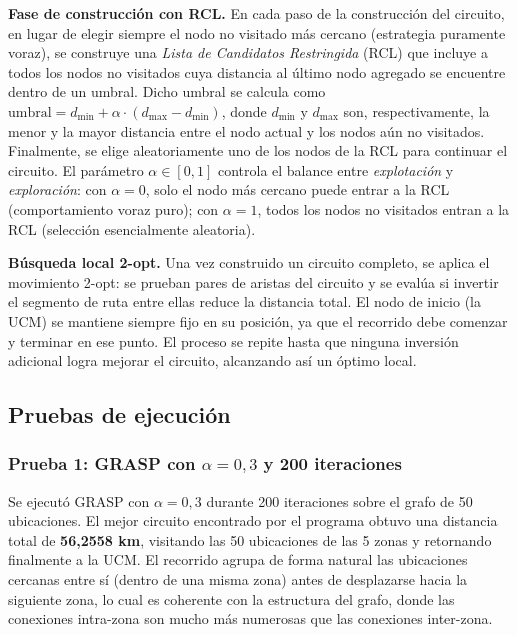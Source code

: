 \documentclass[12pt,letterpaper]{article}
\begin{document}
\textbf{Fase de construcción con RCL.} En cada paso de la construcción del circuito, en lugar de
elegir siempre el nodo no visitado más cercano (estrategia puramente voraz), se construye una
\textit{Lista de Candidatos Restringida} (RCL) que incluye a todos los nodos no visitados cuya
distancia al último nodo agregado se encuentre dentro de un umbral. Dicho umbral se calcula como
$\text{umbral} = d_{\min} + \alpha \cdot (d_{\max} - d_{\min})$, donde $d_{\min}$ y $d_{\max}$
son, respectivamente, la menor y la mayor distancia entre el nodo actual y los nodos aún no
visitados. Finalmente, se elige aleatoriamente uno de los nodos de la RCL para continuar el
circuito. El parámetro $\alpha \in [0,1]$ controla el balance entre \textit{explotación} y
\textit{exploración}: con $\alpha = 0$, solo el nodo más cercano puede entrar a la RCL
(comportamiento voraz puro); con $\alpha = 1$, todos los nodos no visitados entran a la RCL
(selección esencialmente aleatoria).

\textbf{Búsqueda local 2-opt.} Una vez construido un circuito completo, se aplica el movimiento
2-opt: se prueban pares de aristas del circuito y se evalúa si invertir el segmento de ruta entre
ellas reduce la distancia total. El nodo de inicio (la UCM) se mantiene siempre fijo en su
posición, ya que el recorrido debe comenzar y terminar en ese punto. El proceso se repite hasta
que ninguna inversión adicional logra mejorar el circuito, alcanzando así un óptimo local.

\subsection{Pruebas de ejecución}

\subsubsection*{Prueba 1: GRASP con $\alpha = 0{,}3$ y 200 iteraciones}

Se ejecutó GRASP con $\alpha = 0{,}3$ durante 200 iteraciones sobre el grafo de 50 ubicaciones.
El mejor circuito encontrado por el programa obtuvo una distancia total de \textbf{56,2558 km},
visitando las 50 ubicaciones de las 5 zonas y retornando finalmente a la UCM. El recorrido
agrupa de forma natural las ubicaciones cercanas entre sí (dentro de una misma zona) antes de
desplazarse hacia la siguiente zona, lo cual es coherente con la estructura del grafo, donde las
conexiones intra-zona son mucho más numerosas que las conexiones inter-zona.
\end{document}
